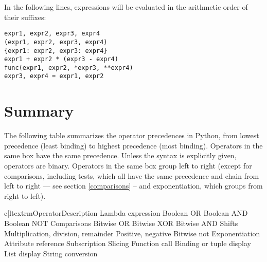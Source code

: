 In the following lines, expressions will be evaluated in the
arithmetic order of their suffixes:

\begin{verbatim}
expr1, expr2, expr3, expr4
(expr1, expr2, expr3, expr4)
{expr1: expr2, expr3: expr4}
expr1 + expr2 * (expr3 - expr4)
func(expr1, expr2, *expr3, **expr4)
expr3, expr4 = expr1, expr2
\end{verbatim}

\section{Summary\label{summary}}

The following table summarizes the operator
precedences in Python, from lowest
precedence (least binding) to highest precedence (most binding).
Operators in the same box have the same precedence.  Unless the syntax
is explicitly given, operators are binary.  Operators in the same box
group left to right (except for comparisons, including tests, which all
have the same precedence and chain from left to right --- see section
\ref{comparisons} -- and exponentiation, which groups from right to left).

\begin{tableii}{c|l}{textrm}{Operator}{Description}
    			{Lambda expression}
  \hline
    			{Boolean OR}
  \hline
    			{Boolean AND}
  \hline
    		{Boolean NOT}
  \hline
    \lineii{\code{<}, \code{<=}, \code{>}, \code{>=},
            \code{<>}, \code{!=}, \code{==}}
	   {Comparisons}
  \hline
    \lineii{\code{|}}				{Bitwise OR}
  \hline
    \lineii{\code{\^}}				{Bitwise XOR}
  \hline
    \lineii{\code{\&}}				{Bitwise AND}
  \hline
    \lineii{\code{<}\code{<}, \code{>}\code{>}}	{Shifts}
  \hline
  \hline
    \lineii{\code{*}, \code{/}, \code{\%}}
           {Multiplication, division, remainder}
  \hline
    	{Positive, negative}
    			{Bitwise not}
  \hline
    \lineii{\code{**}}				{Exponentiation}
  \hline
    	{Attribute reference}
    	{Subscription}
    	{Slicing}
    	{Function call}
  \hline
    	{Binding or tuple display}
    	{List display}
    	{String conversion}
\end{tableii}
